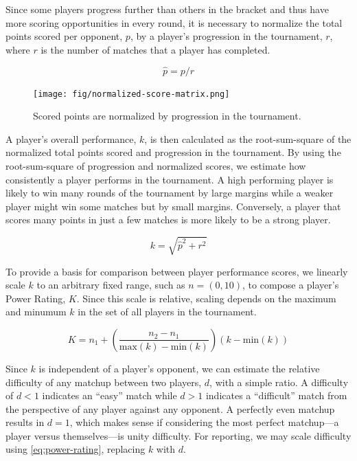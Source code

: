 \documentclass[letterpaper, 10 pt, conference]{ieeeconf}  %
\begin{document}
Since some players progress further than others in the bracket and thus have
more scoring opportunities in every round, it is necessary to normalize the
total points scored per opponent, $p$, by a player's progression in the
tournament, $r$, where $r$ is the number of matches that a player has completed.


\begin{equation}
        \hat{p} = p/r
        \label{eq:normalized-score}
\end{equation}

\begin{figure}[ht]
        \texttt{[image: fig/normalized-score-matrix.png]}
        \label{fig:normalized-score}
        \centering
        \caption{Scored points are normalized by progression in the tournament.}
\end{figure}

A player's overall performance, $k$, is then calculated as the root-sum-square
of the normalized total points scored and progression in the tournament. By
using the root-sum-square of progression and normalized scores, we estimate how
consistently a player performs in the tournament. A high performing player is
likely to win many rounds of the tournament by large margins while a weaker
player might win some matches but by small margins. Conversely, a player that
scores many points in just a few matches is more likely to be a strong player.

\begin{equation}
        k = \sqrt{\hat{p}^2 + r^2}
        \label{eq:skill-indicator}
\end{equation}

To provide a basis for comparison between player performance scores, we linearly
scale $k$ to an arbitrary fixed range, such as $n = (0,10)$, to compose a
player's Power Rating, $K$. Since this scale is relative, scaling depends on the
maximum and minumum $k$ in the set of all players in the tournament.

\begin{equation}
        K = n_1 + \left(\frac{n_2 - n_1}{\text{max}(k) - \text{min}(k)}\right)(k - \text{min}(k))  
        \label{eq:power-rating}
\end{equation}

Since $k$ is independent of a player's opponent, we can estimate the relative
difficulty of any matchup between two players, $d$, with a simple ratio. A
difficulty of $d<1$ indicates an ``easy'' match while $d>1$ indicates a
``difficult'' match from the perspective of any player against any opponent. A
perfectly even matchup results in $d=1$, which makes sense if considering the
most perfect matchup---a player versus themselves---is unity difficulty. For
reporting, we may scale difficulty using \autoref{eq:power-rating}, replacing
$k$ with $d$. 
\end{document}
